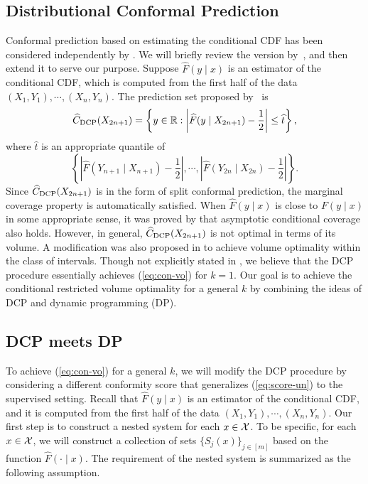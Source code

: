 \subsection{Distributional Conformal Prediction}
Conformal prediction based on estimating the conditional CDF has been considered independently by \cite{izbicki2020flexible,chernozhukov2021distributional}. 
We will briefly review the version by~\citet{chernozhukov2021distributional}, and then extend it to serve our purpose. Suppose $\widehat{F}(y\mid x)$ is an estimator of the conditional CDF, which is computed from the first half of the data $(X_1,Y_1),\cdots,(X_n,Y_n)$.
The prediction set proposed by~\citet{chernozhukov2021distributional} is
$$\widehat{C}_{\rm DCP}(X_{2n+1})=\left\{y\in\mathbb{R}:\left|\widehat{F}(y\mid X_{2n+1})-\frac{1}{2}\right|\leq \widehat{t}\right\},$$
where $\widehat{t}$ is an appropriate quantile of $$\left\{\left|\widehat{F}(Y_{n+1}\mid X_{n+1})-\frac{1}{2}\right|,\cdots,\left|\widehat{F}(Y_{2n}\mid X_{2n})-\frac{1}{2}\right|\right\}.$$
Since $\widehat{C}_{\rm DCP}(X_{2n+1})$ is in the form of split conformal prediction, the marginal coverage property is automatically satisfied. When $\widehat{F}(y\mid x)$ is close to $F(y\mid x)$ in some appropriate sense, it was proved by \cite{chernozhukov2021distributional} that asymptotic conditional coverage also holds. However, in general, $\widehat{C}_{\rm DCP}(X_{2n+1})$ is not optimal in terms of its volume. A modification was also proposed in \cite{chernozhukov2021distributional} to achieve volume optimality within the class of intervals. Though not explicitly stated in \cite{chernozhukov2021distributional}, we believe that the DCP procedure essentially achieves (\ref{eq:con-vo}) for $k=1$. Our goal is to achieve the conditional restricted volume optimality for a general $k$ by combining the ideas of DCP and dynamic programming (DP).

\subsection{DCP meets DP}\label{sec:DCP-DP}

To achieve (\ref{eq:con-vo}) for a general $k$, we will modify the DCP procedure by considering a different conformity score that generalizes (\ref{eq:score-un}) to the supervised setting. Recall that $\widehat{F}(y\mid x)$ is an estimator of the conditional CDF, and it is computed from the first half of the data $(X_1,Y_1),\cdots,(X_n,Y_n)$. Our first step is to construct a nested system for each $x\in\mathcal{X}$. To be specific, for each $x\in\mathcal{X}$, we will construct a collection of sets $\{S_j(x)\}_{j\in[m]}$ based on the function $\widehat{F}(\cdot\mid x)$. The requirement of the nested system is summarized as the following assumption.

